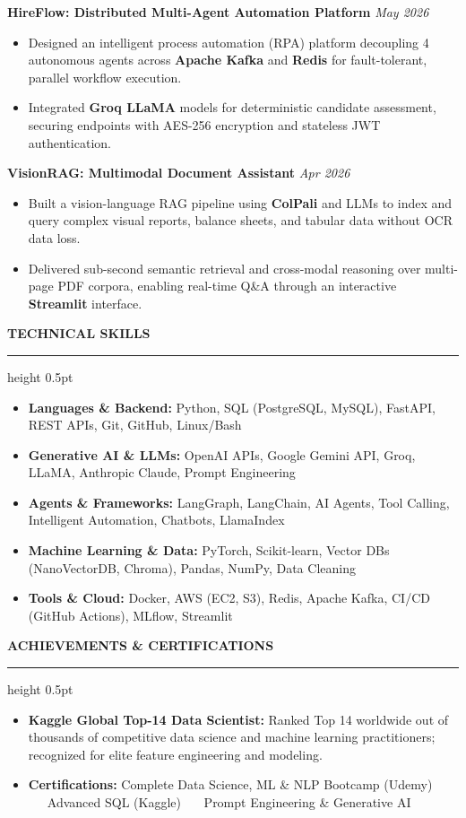 \documentclass[10pt,letterpaper]{article}
\newcommand{\resumesection}[1]{%
  \vspace{3.5pt}%
  {\fontsize{10.5pt}{12pt}\selectfont\textbf{\MakeUppercase{#1}}}%
  \vspace{1.5pt}%
  \hrule height 0.5pt%
  \vspace{2.5pt}%
}
\begin{document}
\vspace{2pt}
\noindent\textbf{HireFlow: Distributed Multi-Agent Automation Platform} \hfill \textit{May 2026}
\begin{itemize}
  \item Designed an intelligent process automation (RPA) platform decoupling 4 autonomous agents across \textbf{Apache Kafka} and \textbf{Redis} for fault-tolerant, parallel workflow execution.
  \item Integrated \textbf{Groq LLaMA} models for deterministic candidate assessment, securing endpoints with AES-256 encryption and stateless JWT authentication.
\end{itemize}

\vspace{2pt}
\noindent\textbf{VisionRAG: Multimodal Document Assistant} \hfill \textit{Apr 2026}
\begin{itemize}
  \item Built a vision-language RAG pipeline using \textbf{ColPali} and LLMs to index and query complex visual reports, balance sheets, and tabular data without OCR data loss.
  \item Delivered sub-second semantic retrieval and cross-modal reasoning over multi-page PDF corpora, enabling real-time Q\&A through an interactive \textbf{Streamlit} interface.
\end{itemize}

\resumesection{Technical Skills}
\begin{itemize}[leftmargin=0pt, label={}]
  \item \textbf{Languages \& Backend:} Python, SQL (PostgreSQL, MySQL), FastAPI, REST APIs, Git, GitHub, Linux/Bash
  \item \textbf{Generative AI \& LLMs:} OpenAI APIs, Google Gemini API, Groq, LLaMA, Anthropic Claude, Prompt Engineering
  \item \textbf{Agents \& Frameworks:} LangGraph, LangChain, AI Agents, Tool Calling, Intelligent Automation, Chatbots, LlamaIndex
  \item \textbf{Machine Learning \& Data:} PyTorch, Scikit-learn, Vector DBs (NanoVectorDB, Chroma), Pandas, NumPy, Data Cleaning
  \item \textbf{Tools \& Cloud:} Docker, AWS (EC2, S3), Redis, Apache Kafka, CI/CD (GitHub Actions), MLflow, Streamlit
\end{itemize}

\resumesection{Achievements \& Certifications}
\begin{itemize}
  \item \textbf{Kaggle Global Top-14 Data Scientist:} Ranked Top 14 worldwide out of thousands of competitive data science and machine learning practitioners; recognized for elite feature engineering and modeling.
  \item \textbf{Certifications:} Complete Data Science, ML \& NLP Bootcamp (Udemy) \ \textbar\ \ Advanced SQL (Kaggle) \ \textbar\ \ Prompt Engineering \& Generative AI
\end{itemize}
\end{document}
